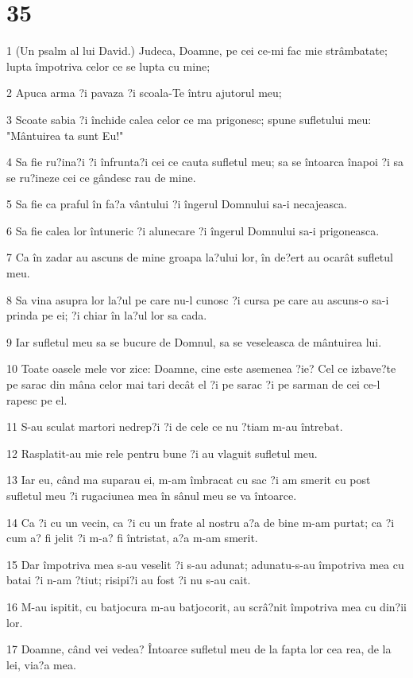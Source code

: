 \chapter{35}

\par 1 (Un psalm al lui David.) Judeca, Doamne, pe cei ce-mi fac mie strâmbatate; lupta împotriva celor ce se lupta cu mine;
\par 2 Apuca arma ?i pavaza ?i scoala-Te întru ajutorul meu;
\par 3 Scoate sabia ?i închide calea celor ce ma prigonesc; spune sufletului meu: "Mântuirea ta sunt Eu!"
\par 4 Sa fie ru?ina?i ?i înfrunta?i cei ce cauta sufletul meu; sa se întoarca înapoi ?i sa se ru?ineze cei ce gândesc rau de mine.
\par 5 Sa fie ca praful în fa?a vântului ?i îngerul Domnului sa-i necajeasca.
\par 6 Sa fie calea lor întuneric ?i alunecare ?i îngerul Domnului sa-i prigoneasca.
\par 7 Ca în zadar au ascuns de mine groapa la?ului lor, în de?ert au ocarât sufletul meu.
\par 8 Sa vina asupra lor la?ul pe care nu-l cunosc ?i cursa pe care au ascuns-o sa-i prinda pe ei; ?i chiar în la?ul lor sa cada.
\par 9 Iar sufletul meu sa se bucure de Domnul, sa se veseleasca de mântuirea lui.
\par 10 Toate oasele mele vor zice: Doamne, cine este asemenea ?ie? Cel ce izbave?te pe sarac din mâna celor mai tari decât el ?i pe sarac ?i pe sarman de cei ce-l rapesc pe el.
\par 11 S-au sculat martori nedrep?i ?i de cele ce nu ?tiam m-au întrebat.
\par 12 Rasplatit-au mie rele pentru bune ?i au vlaguit sufletul meu.
\par 13 Iar eu, când ma suparau ei, m-am îmbracat cu sac ?i am smerit cu post sufletul meu ?i rugaciunea mea în sânul meu se va întoarce.
\par 14 Ca ?i cu un vecin, ca ?i cu un frate al nostru a?a de bine m-am purtat; ca ?i cum a? fi jelit ?i m-a? fi întristat, a?a m-am smerit.
\par 15 Dar împotriva mea s-au veselit ?i s-au adunat; adunatu-s-au împotriva mea cu batai ?i n-am ?tiut; risipi?i au fost ?i nu s-au cait.
\par 16 M-au ispitit, cu batjocura m-au batjocorit, au scrâ?nit împotriva mea cu din?ii lor.
\par 17 Doamne, când vei vedea? Întoarce sufletul meu de la fapta lor cea rea, de la lei, via?a mea.
